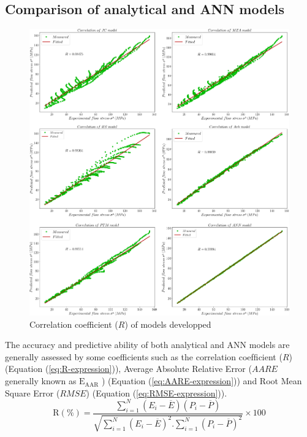 \documentclass[twoside,english,1p,final,sort&compress]{elsarticle}
\theoremstyle{plain}
\newcommand{\AARE}{\text{E}_\text{AAR}}
\newcommand{\R}{\text{R}}
\begin{document}
\FloatBarrier
\subsection{Comparison of analytical and ANN models\label{sec:Comparison}}
\begin{figure}[!ht]
\centering
\includegraphics[width=1.02\columnwidth]
{newFigures/Correlation}
\caption{Correlation coefficient ($R$) of models developped}
\label{fig:Correlation}
\end{figure}
The accuracy and predictive ability of both analytical and ANN models are generally assessed by some coefficients such as the correlation coefﬁcient ($R$) (Equation (\ref{eq:R-expression})), Average Absolute Relative Error ($AARE$ generally known as $\AARE$ ) (Equation (\ref{eq:AARE-expression})) and Root Mean Square Error ($RMSE$) (Equation (\ref{eq:RMSE-expression})).
\begin{equation}
\label{eq:R-expression}
\R(\%) = \frac{\displaystyle\sum_{i=1}^{N}{\left(E_i - \overline{E}\right)\left(P_i - \overline{P}\right)}}{\sqrt{\displaystyle\sum_{i=1}^{N}\left(E_i - \overline{E}\right)^2 .\displaystyle\sum_{i=1}^{N}\left(P_i - \overline{P}\right)^2}}\times 100
\end{equation}
\end{document}
